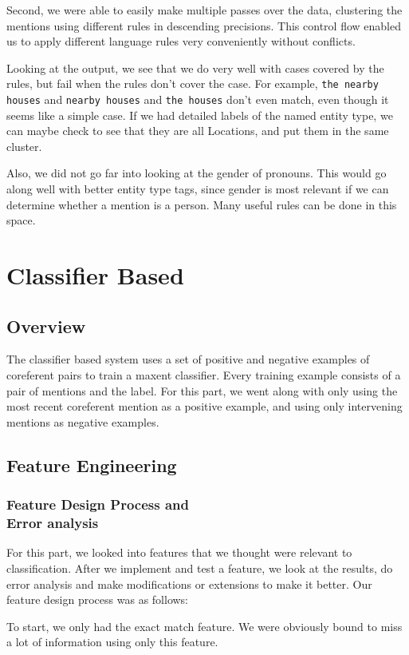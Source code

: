 \documentclass[12pt, twocolumn]{article}
\begin{document}
Second, we were able to easily make multiple passes over the data, clustering the mentions using different rules in descending precisions. This control flow enabled us to apply different language rules very conveniently without conflicts.

Looking at the output, we see that we do very well with cases covered by the rules, but fail when the rules don't cover the case. For example, \texttt{the nearby houses} and \texttt{nearby houses} and \texttt{the houses} don't even match, even though it seems like a simple case.
If we had detailed labels of the named entity type, we can maybe check to see that they are all Locations, and put them in the same cluster.

Also, we did not go far into looking at the gender of pronouns. This would go along well with better entity type tags, since gender is most relevant if we can determine whether a mention is a person. Many useful rules can be done in this space.
\section{Classifier Based}
\subsection{Overview}
The classifier based system uses a set of positive and negative examples of coreferent pairs to train a maxent classifier. Every training example consists of a pair of mentions and the label. For this part, we went along with only using the most recent coreferent mention as a positive example, and using only intervening mentions as negative examples. 
\subsection{Feature Engineering}
\subsubsection{Feature Design Process and\\ Error analysis}
For this part, we looked into features that we thought were relevant to classification. After we implement and test a feature, we look at the results, do error analysis and make modifications or extensions to make it better. Our feature design process was as follows:

To start, we only had the exact match feature. We were obviously bound to miss a lot of information using only this feature. 
\end{document}
